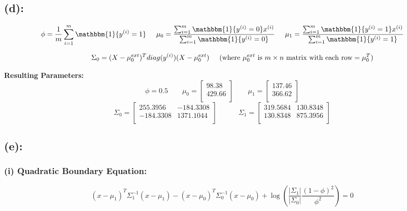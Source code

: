 \documentclass[a4 paper]{article}
\begin{document}
\subsection*{(d):}
$$ \phi = \frac{1}{m} \sum_{i=1}^{m} \mathbbm{1}\{y^{(i)}=1\} \hspace*{0.5cm}
\mu_0 = \frac{\sum_{i=1}^{m} \mathbbm{1}\{y^{(i)}=0\} x^{(i)}}{\sum_{i=1}^{m} \mathbbm{1}\{y^{(i)}=0\}} \hspace*{0.5cm}
\mu_1 = \frac{\sum_{i=1}^{m} \mathbbm{1}\{y^{(i)}=1\} x^{(i)}}{\sum_{i=1}^{m} \mathbbm{1}\{y^{(i)}=1\}}  $$

$$ \hspace*{1cm} \Sigma_0 = (X-\mu_0^{ext})^Tdiag(y^{(i)})(X-\mu_0^{ext}) \hspace*{0.5cm} (\text{where } \mu_0^{ext} \text{ is } m \times n \text{ matrix with each row}= \mu_0^T) $$

\vspace*{0.5cm}
\textbf{Resulting Parameters:}
$$ \phi = 0.5 \quad \quad
\mu_0 = 
\begin{bmatrix}
	98.38 \\ 429.66\\
\end{bmatrix} \quad \quad
\mu_1 = 
\begin{bmatrix}
	137.46 \\ 366.62 \\ 
\end{bmatrix} $$
$$\Sigma_0 = 
\begin{bmatrix}
	255.3956 & -184.3308 \\ 
   -184.3308 & 1371.1044 \\
\end{bmatrix} \quad \quad \quad 
\Sigma_1 = 
\begin{bmatrix}
	319.5684 & 130.8348 \\
 	130.8348 & 875.3956 \\
\end{bmatrix}$$

\subsection*{(e):}

\subsubsection*{(i) Quadratic Boundary Equation:}

	$$ (x-\mu_1)^T \Sigma_1^{-1} (x-\mu_1) - (x-\mu_0)^T \Sigma_0^{-1} (x-\mu_0) + \log \left(\frac{|\Sigma_1|}{|\Sigma_0|} \frac{(1-\phi)^2}{\phi^2} \right) = 0$$
\end{document}
